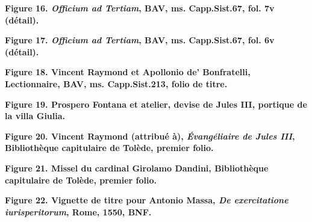 \documentclass[12pt,twoside,openany]{book}
\begin{document}
\begin{center}
\par\small \textbf{Figure 16. \textit{Officium ad Tertiam}, BAV, ms. Capp.Sist.67, fol. 7v (détail).}
\end{center}

\begin{center}
\par\small \textbf{Figure 17. \textit{Officium ad Tertiam}, BAV, ms. Capp.Sist.67, fol. 6v (détail).}
\end{center}

\begin{center}
\par\small \textbf{Figure 18. Vincent Raymond et Apollonio de’ Bonfratelli, Lectionnaire, BAV, ms. Capp.Sist.213, folio de titre.}
\end{center}

\begin{center}
\par\small \textbf{Figure 19. Prospero Fontana et atelier, devise de Jules III, portique de la villa Giulia.}
\end{center}

\begin{center}
\par\small \textbf{Figure 20. Vincent Raymond (attribué à), \textit{Évangéliaire de Jules III}, Bibliothèque capitulaire de Tolède, premier folio.}
\end{center}

\begin{center}
\par\small \textbf{Figure 21. Missel du cardinal Girolamo Dandini, Bibliothèque capitulaire de Tolède, premier folio.}
\end{center}

\begin{center}
\par\small \textbf{Figure 22. Vignette de titre pour Antonio Massa,\textit{ De exercitatione iurisperitorum}, Rome, 1550, BNF.}
\end{center}
\end{document}
